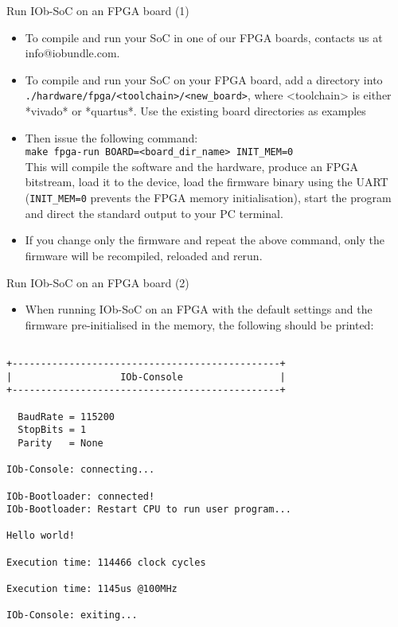 \documentclass [xcolor=svgnames, t] {beamer}
\begin{document}
\begin{frame}{Run IOb-SoC on an FPGA board (1)}
\begin{itemize}
\item To compile and run your SoC in one of our FPGA boards, contacts us at info@iobundle.com.
\item To compile and run your SoC on your FPGA board, add a directory into {\tt ./hardware/fpga/<toolchain>/<new\_board>}, where <toolchain> is either *vivado* or *quartus*. Use the existing board directories as examples
\item Then issue the following command:\\
  {\tt make fpga-run BOARD=<board\_dir\_name> INIT\_MEM=0}\\
  This will compile the software and the hardware, produce an FPGA bitstream,
  load it to the device, load the firmware binary using the UART ({\tt INIT\_MEM=0} prevents the FPGA memory initialisation), start the
  program and direct the standard output to your PC terminal.
\item If you change only the firmware and repeat the above command, only the
  firmware will be recompiled, reloaded and rerun.
\end{itemize}
\end{frame}


\begin{frame}[fragile]{Run IOb-SoC on an FPGA board (2)}
\begin{itemize}
\item When running IOb-SoC on an FPGA with the default settings and the firmware
  pre-initialised in the memory, the following should be printed:
\end{itemize}

\begin{tiny}
  \begin{lstlisting}

+-----------------------------------------------+
|                   IOb-Console                 |
+-----------------------------------------------+

  BaudRate = 115200
  StopBits = 1
  Parity   = None

IOb-Console: connecting...

IOb-Bootloader: connected!
IOb-Bootloader: Restart CPU to run user program...

Hello world!

Execution time: 114466 clock cycles

Execution time: 1145us @100MHz

IOb-Console: exiting...

  \end{lstlisting}
\end{tiny}
\end{frame}
\end{document}
